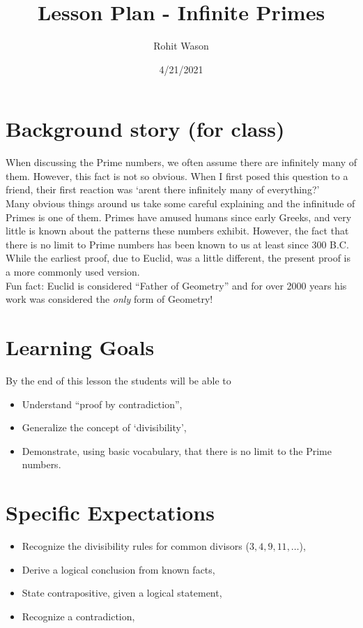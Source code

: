 \documentclass{article}
\author{Rohit Wason}
\title{Lesson Plan - Infinite Primes}
\date{4/21/2021}
\begin{document}
\maketitle

\section*{Background story (for class)}
When discussing the Prime numbers, we often assume there are infinitely
many of them. However, this fact is not so obvious. When I first posed this
question to a friend, their first reaction was `aren\textquotesingle t there infinitely many of 
everything?'\\

Many obvious things around us take some careful explaining and the infinitude of Primes
is one of them. Primes have amused humans since early Greeks, and very
little is known about the patterns these numbers exhibit. However, the fact that there
is no limit to Prime numbers has been known to us at least since 300 B.C. While the
earliest proof, due to Euclid, was a little different, 
the present proof is a more commonly used version.\\

Fun fact: Euclid is considered ``Father of Geometry'' and for over 2000 years
his work was considered the \textit{only} form of Geometry!

\section*{Learning Goals}
By the end of this lesson the students will be able to
\begin{itemize}
  \item Understand ``proof by contradiction'',
  \item Generalize the concept of `divisibility',
  \item Demonstrate, using basic vocabulary, that there is no limit to the Prime numbers.
\end{itemize}

\section*{Specific Expectations}
\begin{itemize}
  \item Recognize the divisibility rules for common divisors ($3,4,9,11,\dots$),
  \item Derive a logical conclusion from known facts,
  \item State contrapositive, given a logical statement,
  \item Recognize a contradiction,
\end{itemize}
\end{document}
